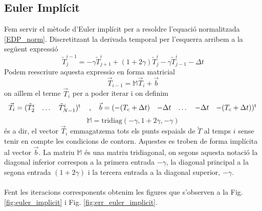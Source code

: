 \documentclass{article}
\begin{document}
\subsection{Euler Implícit}
Fem servir el mètode d'Euler implícit per a resoldre l'equació normalitzada \eqref{EDP_norm}. Discretitzant la derivada temporal per l'esquerra arribem a la següent expressió
\begin{equation}\label{disc_eu_imp}
    \tilde{T}_{j}^{i-1} = -\gamma \tilde{T}_{j+1}^{i} + (1+2\gamma)\tilde{T}_{j}^{i} - \gamma\tilde{T}_{j-1}^{i} - \Delta t
\end{equation}
Podem reescriure aquesta expressio en forma matricial
\begin{equation*}
    \vec{T}_{i-1} = \mathbb{M}\vec{T}_{i} + \vec{b}
\end{equation*}
on aïllem el terme $\vec{T}_i$ per a poder iterar i on definim
\begin{equation*}
    \vec{T}_{i} = \begin{matrix} ( \tilde{T}_{2}^{i} & \dots & \tilde{T}_{N-1}^{i} )^{\text{t}} \end{matrix} \hspace{4 mm} \text{,} \hspace{4 mm} \vec{b} = \begin{matrix} ( -(T_c + \Delta t) & -\Delta t &\dots&-\Delta t & -(T_c + \Delta t) )^{\text{t}} \end{matrix} 
\end{equation*}
\begin{equation*}
    \mathbb{M} = \text{tridiag}(-\gamma,1+2\gamma,-\gamma)
\end{equation*}
és a dir, el vector $\vec{T}_{i}$ emmagatzema tots els punts espaials de $\tilde{T}$ al temps $i$ sense tenir en compte les condicions de contorn. Aquestes es troben de forma implícita al vector $\vec{b}$. La matriu $\mathbb{M}$ és una matriu tridiagonal, on segons aquesta notació la diagonal inferior correspon a la primera entrada $-\gamma$, la diagonal principal a la segona entrada $(1+2\gamma)$ i la tercera entrada a la diagonal superior, $-\gamma$.\\\\
Fent les iteracions corresponents obtenim les figures que s'observen a la Fig. \ref{fig:euler_implicit} i Fig. \ref{fig:err_euler_implicit}.
\end{document}

